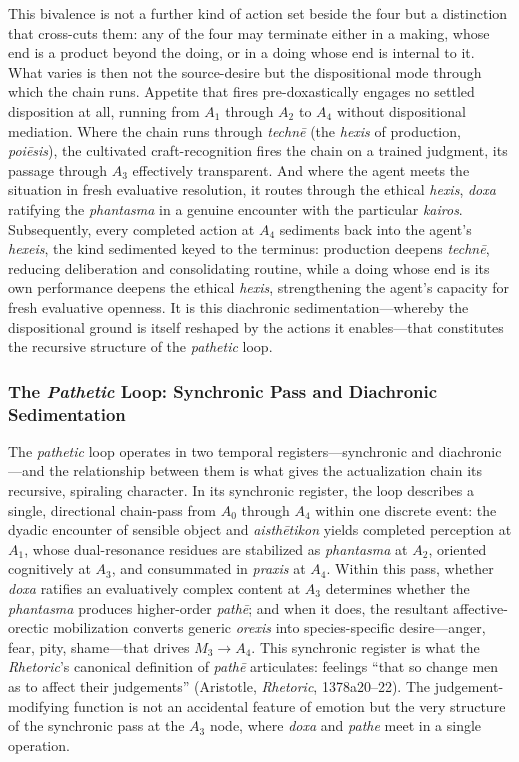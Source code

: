 This bivalence is not a further kind of action set beside the four but a distinction that cross-cuts them: any of the four may terminate either in a making, whose end is a product beyond the doing, or in a doing whose end is internal to it. What varies is then not the source-desire but the dispositional mode through which the chain runs. Appetite that fires pre-doxastically engages no settled disposition at all, running from $A_1$ through $A_2$ to $A_4$ without dispositional mediation. Where the chain runs through \textit{technē} (the \textit{hexis} of production, \textit{poiēsis}), the cultivated craft-recognition fires the chain on a trained judgment, its passage through $A_3$ effectively transparent. And where the agent meets the situation in fresh evaluative resolution, it routes through the ethical \textit{hexis}, \textit{doxa} ratifying the \textit{phantasma} in a genuine encounter with the particular \textit{kairos}. Subsequently, every completed action at $A_4$ sediments back into the agent's \textit{hexeis}, the kind sedimented keyed to the terminus: production deepens \textit{technē}, reducing deliberation and consolidating routine, while a doing whose end is its own performance deepens the ethical \textit{hexis}, strengthening the agent's capacity for fresh evaluative openness. It is this diachronic sedimentation---whereby the dispositional ground is itself reshaped by the actions it enables---that constitutes the recursive structure of the \textit{pathetic} loop.


\subsubsection*{The \textit{Pathetic} Loop: Synchronic Pass and Diachronic Sedimentation}

The \textit{pathetic} loop operates in two temporal registers---synchronic and diachronic---and the relationship between them is what gives the actualization chain its recursive, spiraling character. In its synchronic register, the loop describes a single, directional chain-pass from $A_0$ through $A_4$ within one discrete event: the dyadic encounter of sensible object and \textit{aisthētikon} yields completed perception at $A_1$, whose dual-resonance residues are stabilized as \textit{phantasma} at $A_2$, oriented cognitively at $A_3$, and consummated in \textit{praxis} at $A_4$. Within this pass, whether \textit{doxa} ratifies an evaluatively complex content at $A_3$ determines whether the \textit{phantasma} produces higher-order \textit{pathē}; and when it does, the resultant affective-orectic mobilization converts generic \textit{orexis} into species-specific desire---anger, fear, pity, shame---that drives $M_3 \rightarrow A_4$. This synchronic register is what the \textit{Rhetoric}'s canonical definition of \textit{pathē} articulates: feelings ``that so change men as to affect their judgements'' (Aristotle, \textit{Rhetoric}, 1378a20--22). The judgement-modifying function is not an accidental feature of emotion but the very structure of the synchronic pass at the $A_3$ node, where \textit{doxa} and \textit{pathe} meet in a single operation.

